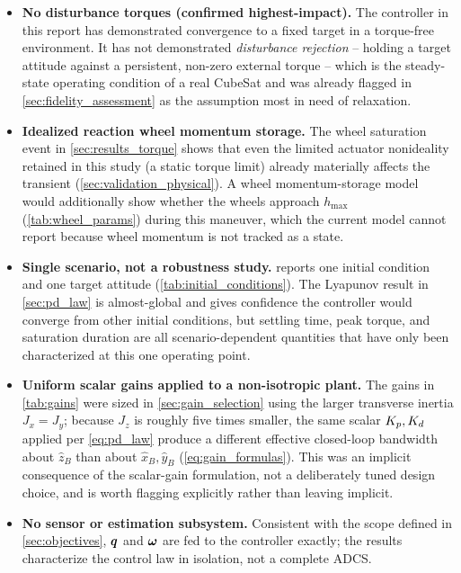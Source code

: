 \begin{itemize}
    \item \textbf{No disturbance torques (confirmed highest-impact).} The controller in this report has demonstrated convergence to a fixed target in a torque-free environment. It has not demonstrated \emph{disturbance rejection} -- holding a target attitude against a persistent, non-zero external torque -- which is the steady-state operating condition of a real CubeSat and was already flagged in \cref{sec:fidelity_assessment} as the assumption most in need of relaxation.
    \item \textbf{Idealized reaction wheel momentum storage.} The wheel saturation event in \cref{sec:results_torque} shows that even the limited actuator nonideality retained in this study (a static torque limit) already materially affects the transient (\cref{sec:validation_physical}). A wheel momentum-storage model would additionally show whether the wheels approach $h_{\max}$ (\cref{tab:wheel_params}) during this maneuver, which the current model cannot report because wheel momentum is not tracked as a state.
    \item \textbf{Single scenario, not a robustness study.}  reports one initial condition and one target attitude (\cref{tab:initial_conditions}). The Lyapunov result in \cref{sec:pd_law} is almost-global and gives confidence the controller would converge from other initial conditions, but settling time, peak torque, and saturation duration are all scenario-dependent quantities that have only been characterized at this one operating point.
    \item \textbf{Uniform scalar gains applied to a non-isotropic plant.} The gains in \cref{tab:gains} were sized in \cref{sec:gain_selection} using the larger transverse inertia $J_x=J_y$; because $J_z$ is roughly five times smaller, the same scalar $K_{p},K_{d}$ applied per \cref{eq:pd_law} produce a different effective closed-loop bandwidth about $\hat z_B$ than about $\hat x_B,\hat y_B$ (\cref{eq:gain_formulas}). This was an implicit consequence of the scalar-gain formulation, not a deliberately tuned design choice, and is worth flagging explicitly rather than leaving implicit.
    \item \textbf{No sensor or estimation subsystem.} Consistent with the scope defined in \cref{sec:objectives}, $\bm{q}$ and $\bm{\omega}$ are fed to the controller exactly; the results characterize the control law in isolation, not a complete ADCS.
\end{itemize}

